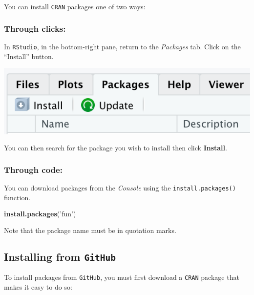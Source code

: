 \documentclass[
]{book}
\newenvironment{Shaded}{\begin{snugshade}}{\end{snugshade}}
\newcommand{\KeywordTok}[1]{\textcolor[rgb]{0.13,0.29,0.53}{\textbf{#1}}}
\newcommand{\NormalTok}[1]{#1}
\newcommand{\StringTok}[1]{\textcolor[rgb]{0.31,0.60,0.02}{#1}}
\begin{document}
You can install \texttt{CRAN} packages one of two ways:

\hypertarget{through-clicks}{%
\subsubsection*{Through clicks:}\label{through-clicks}}

In \texttt{RStudio}, in the bottom-right pane, return to the \emph{Packages} tab. Click on the ``Install'' button.

\includegraphics{img/rstudio_install-package.png}

You can then search for the package you wish to install then click \textbf{Install}.

\hypertarget{through-code}{%
\subsubsection*{Through code:}\label{through-code}}

You can download packages from the \emph{Console} using the \texttt{install.packages()} function.

\begin{Shaded}
\begin{Highlighting}[]
\KeywordTok{install.packages}\NormalTok{(}\StringTok{'fun'}\NormalTok{)}
\end{Highlighting}
\end{Shaded}

Note that the package name must be in quotation marks.

\hypertarget{installing-from-github}{%
\subsection*{\texorpdfstring{Installing from \texttt{GitHub}}{Installing from GitHub}}\label{installing-from-github}}

To install packages from \texttt{GitHub}, you must first download a \texttt{CRAN} package that makes it easy to do so:
\end{document}
